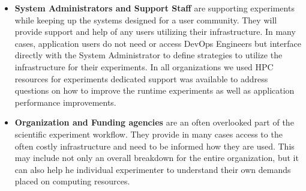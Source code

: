 \documentclass[utf8]{FrontiersinVancouver} %
\begin{document}
\begin{itemize}
    \item {\bf System Administrators and Support Staff} are supporting experiments while keeping up the systems designed for a user community. They will provide support and help of any users utilizing their infrastructure. In many cases, application users do not need or access DevOps Engineers but interface directly with the System Administrator to define strategies to utilize the infrastructure for their experiments. In all organizations we used HPC resources for experiments dedicated support was available to address questions on how to improve the runtime experiments as well as application performance improvements.
    \item {\bf Organization and Funding agencies} are an often overlooked part of the scientific experiment workflow. They provide in many cases access to the often costly infrastructure and need to be informed how they are used. This may include not only an overall breakdown for the entire organization, but it can also help he individual experimenter to understand their own demands placed on computing resources. 
\end{itemize}
\end{document}
